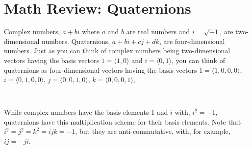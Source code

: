 \section{Math Review:  Quaternions}

Complex numbers, $a+bi$ where $a$ and $b$ are real numbers and $i = \sqrt{-1}$, are two-dimensional numbers.  Quaternions, $a + bi + cj + dk$, are four-dimensional numbers.  Just as you can think of complex numbers being two-dimensional vectors having the basis vectors $1 = \langle 1,0 \rangle$ and $i = \langle 0,1 \rangle$, you can think of quaternions as four-dimensional vectors having the basis vectors 
$1 = \langle 1,0,0,0 \rangle$, 
$i = \langle 0,1,0,0 \rangle$, 
$j = \langle 0,0,1,0 \rangle$, 
$k = \langle 0,0,0,1 \rangle$, 

\

While complex numbers have the basis elements 1 and $i$ with, $i^2 = -1$, quaternions have this multiplication scheme for their basis elements.  Note that $i^2 = j^2 = k^2 = ijk = -1$, but they are anti-commutative, with, for example, $ij = -ji$.

\

\hfil{}
\hfil
{}
\hfil
{}
\hfil

